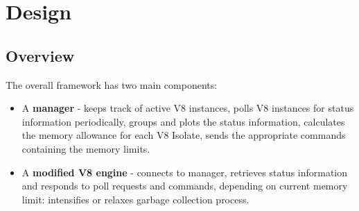 \documentclass{l4proj}
\begin{document}
\chapter{Design}
\section{Overview}

The overall framework has two main components:
\begin{itemize}
\item A \textbf{manager} - keeps track of active V8 instances, polls V8 instances for status information periodically, groups and plots the status information, calculates the memory allowance for each V8 Isolate, sends the appropriate commands containing the memory limits.
\item A \textbf{modified V8 engine} - connects to manager, retrieves status information and responds to poll requests and commands, depending on current memory limit: intensifies or relaxes garbage collection process.
\end{itemize}
\end{document}
